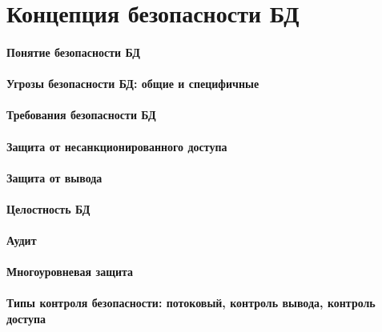 \section{Концепция безопасности БД}
\paragraph{Понятие безопасности БД}
\paragraph{Угрозы безопасности БД: общие и специфичные}
\paragraph{Требования безопасности БД}
\paragraph{Защита от несанкционированного доступа}
\paragraph{Защита от вывода}
\paragraph{Целостность БД}
\paragraph{Аудит}
\paragraph{Многоуровневая защита}
\paragraph{Типы контроля безопасности: потоковый, контроль вывода, контроль доступа}
